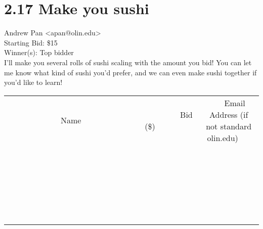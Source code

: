 \documentclass[11pt]{article}
\begin{document}
					\section*{2.17 Make you sushi}
					Andrew Pan <apan@olin.edu> \\
					Starting Bid: \$15 \\
					Winner(s): Top bidder \\
					I'll make you several rolls of sushi scaling with the amount you bid!  You can let me know what kind of sushi you'd prefer, and we can even make sushi together if you'd like to learn! \\
					[6ex]
					\begin{tabular}{c c c}
						~~~~~~~~~~~~~Name~~~~~~~~~~~~~ & ~~~~~~~~~Bid (\$)~~~~~~~~~ & ~~~Email Address (if not standard olin.edu)~~~ \\
				
 & & \\
\hline
 & & \\
\hline
 & & \\
\hline
 & & \\
\hline
 & & \\
\hline
 & & \\
\hline
 & & \\
\hline
 & & \\
\hline
 & & \\
\hline
 & & \\
\hline
 & & \\
\hline
 & & \\
\hline
 & & \\
\hline
 & & \\
\hline
 & & \\
\hline
 & & \\
\hline
 & & \\
\hline
 & & \\
\hline
 & & \\
\hline
 & & \\
\hline
 & & \\
\hline
 & & \\
\hline
 & & \\
\hline
 & & \\
\hline
 & & \\
\hline
 & & \\
\hline
					\end{tabular}
					\clearpage
				
\end{document}
